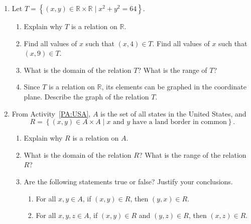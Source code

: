 \hbreak
%
\begin{prog}\label{A:relationexamples} \hfill
\begin{enumerate}
\item Let  
$T = \left\{ {\left( {x, y} \right) \in \mathbb{R} \times \mathbb{R}   \mid x^2  + y^2  = 64} \right\}$. 
\begin{enumerate}
  \item Explain why  $T$ is a relation on  $\mathbb{R}$.

  \item Find all values of  $x$  such that  $\left( {x, 4} \right) \in T$.  Find all values of $x$  such that  
$\left( {x, 9} \right) \in T$\!.

  \item What is the domain of the relation  $T$?  What is the range of  $T$?

  \item Since  $T$  is a relation on  $\mathbb{R}$, its elements can be graphed in the coordinate plane.  Describe the graph of the relation  $T$\!.
\end{enumerate}
\item From \typeu Activity~\ref*{PA:USA}, $A$  is the set of all states in the United States, and
\[
R = \left\{ { {\left( {x, y} \right) \in A \times A } \mid x\text{  and  }y\text{  have a land border in common}} \right\}\!.
\]
\begin{enumerate}
  \item Explain why  $R$  is a relation on  $A$.

  \item What is the domain of the relation  $R$?  What is the range of the relation  $R$?

  \item Are the following statements true or false?  Justify your conclusions.
  \begin{enumerate}
  \item For all $x, y \in A$, if $(x, y) \in R$, then $(y, x) \in R$.
  \item For all $x, y, z \in A$, if $(x, y) \in R$ and $(y, z) \in R$, then $(x, z) \in R$.
  \end{enumerate}
\end{enumerate}
\end{enumerate}
\end{prog}
\hbreak

\endinput
